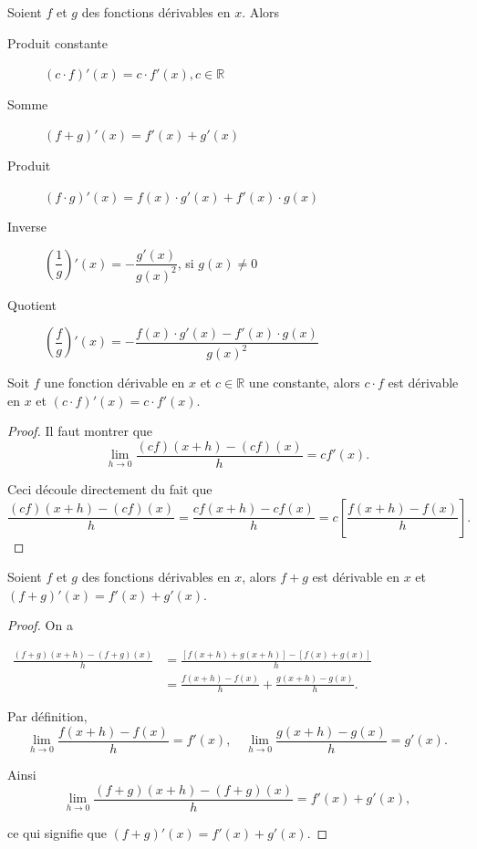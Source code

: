 \documentclass[a4paper,12pt]{article}
\begin{document}
\begin{formules}
	\tcblower
	Soient $f$ et $g$ des fonctions dérivables en $x$. Alors
\begin{description}
	\item[Produit constante] $(c\cdot f)'(x)=c\cdot f'(x), c\in \mathbb{R}$
	\item[Somme]  $(f+g)'(x)=f'(x)+g'(x)$
	\item[Produit] $(f\cdot g)'(x)=f(x)\cdot g'(x)+f'(x)\cdot g(x)$
	\item[Inverse] $\left(\dfrac{1}{g}\right)'(x)=-\dfrac{g'(x)}{g(x)^2}$, si $g(x)\neq 0$
	\item[Quotient] $\left(\dfrac{f}{g}\right)'(x)=-\dfrac{f(x)\cdot g'(x)-f'(x)\cdot g(x)}{g(x)^2}$
\end{description}
\end{formules}
\begin{prop}
   \tcblower
   Soit $f$ une fonction dérivable en $x$ et $c\in \mathbb{R}$ une constante, alors $c\cdot f$ est dérivable en $x$ et $(c\cdot f)'(x)=c\cdot f'(x)$.
   \medskip

   \begin{proof}
   	Il faut montrer que 
   	$$\lim_{h \to 0} \frac{(cf)(x+h) - (cf)(x)}{h} = cf'(x).$$
   	
   	Ceci découle directement du fait que
   	$$\frac{(cf)(x+h) - (cf)(x)}{h} = \frac{cf(x+h) - cf(x)}{h} = c\left[\frac{f(x+h) - f(x)}{h}\right].$$
   \end{proof}
\end{prop}

\begin{prop}
   \tcblower
   Soient $f$ et $g$ des fonctions dérivables en $x$, alors $f+g$ est dérivable en $x$ et $(f+g)'(x)=f'(x)+g'(x)$. 
   \medskip

   \begin{proof}
   On a 	

\medskip
   	$
	\begin{aligned}
		\frac{(f+g)(x+h) - (f+g)(x)}{h} &= \frac{[f(x+h) + g(x+h)] - [f(x) + g(x)]}{h}\\
	&= \frac{f(x+h) - f(x)}{h} + \frac{g(x+h) - g(x)}{h}.
\end{aligned}$
   	
   	Par définition,
   	$$\lim_{h \to 0} \frac{f(x+h) - f(x)}{h} = f'(x), \quad \lim_{h \to 0} \frac{g(x+h) - g(x)}{h} = g'(x).$$
   	
   	Ainsi
   	$$\lim_{h \to 0} \frac{(f+g)(x+h) - (f+g)(x)}{h} = f'(x) + g'(x),$$
   	
   	ce qui signifie que $(f+g)'(x) = f'(x) + g'(x)$.
   \end{proof}
\end{prop}
\end{document}
